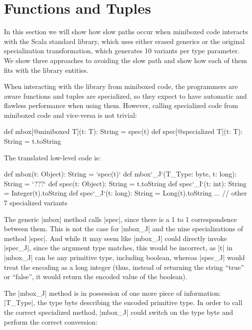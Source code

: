 \section{Functions and Tuples}
\label{sec:library}

In this section we will show how slow paths occur when miniboxed code interacts with the Scala standard library, which uses either erased generics or the original specialization transformation, which generates 10 variants per type parameter. We show three approaches to avoiding the slow path and show how each of them fits with the library entities.

When interacting with the library from miniboxed code, the programmers are aware functions and tuples are specialized, so they expect to have automatic and flawless performance when using them. However, calling specialized code from miniboxed code and vice-versa is not trivial:

\begin{lstlisting-nobreak}
 def mbox[@miniboxed T](t: T): String = spec(t)
 def spec[@specialized T](t: T): String = t.toString
\end{lstlisting-nobreak}

The translated low-level code is:

\begin{lstlisting-nobreak}
 def mbox(t: Object): String = `spec(t)`
 def mbox`_J`(T_Type: byte, t: long): String = `???`
 def spec(t: Object): String = t.toString
 def spec`_I`(t: int): String = Integer(t).toString
 def spec`_J`(t: long): String = Long(t).toString
 ... // other 7 specialized variants
\end{lstlisting-nobreak}

The generic |mbox| method calls |spec|, since there is a 1 to 1 correspondence between them. This is not the case for |mbox_J| and the nine specializations of method |spec|. And while it may seem like |mbox_J| could directly invoke |spec_J|, since the argument type matches, this would be incorrect, as |t| in |mbox_J| can be any primitive type, including boolean, whereas |spec_J| would treat the encoding as a long integer (thus, instead of returning the string ``true'' or ``false'', it would return the encoded value of the boolean).

The |mbox_J| method is in possession of one more piece of information: |T_Type|, the type byte describing the encoded primitive type. In order to call the correct specialized method, |mbox_J| could switch on the type byte and perform the correct conversion:

